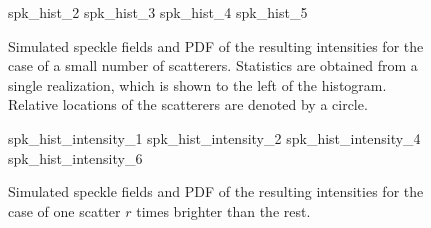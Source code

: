 \begin{figure}[ht]
\centering
{spk_hist_2}
{spk_hist_3}
{spk_hist_4}
{spk_hist_5}
\caption{Simulated speckle fields and PDF of the resulting intensities for
the case of a small number of scatterers.  Statistics are obtained from a
single realization, which is shown to the left of the histogram.  Relative
locations of the scatterers are denoted by a circle.}
\label{fig:lowscatthist}
\end{figure}

\begin{figure}[ht]
\centering
{spk_hist_intensity_1}
{spk_hist_intensity_2}
{spk_hist_intensity_4}
{spk_hist_intensity_6}
\caption{Simulated speckle fields and PDF of the resulting intensities for
the case of one scatter $r$ times brighter than the rest.}
\label{fig:strongsinglefig}
\end{figure}
